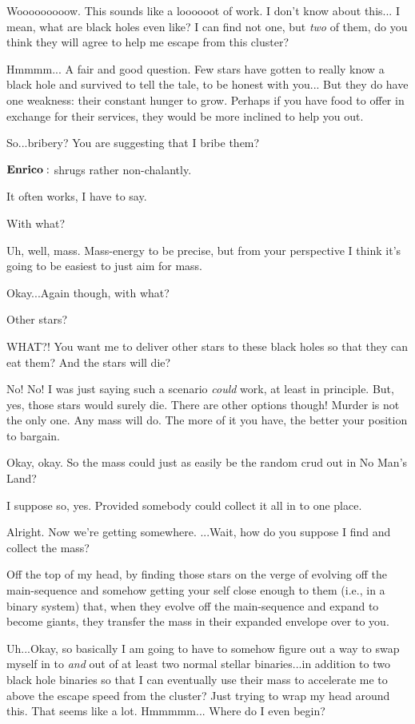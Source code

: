 \Sterope Wooooooooow.  This sounds like a loooooot of work.  I don't know about this... I mean, what are black holes even like?   I can find not one, but \textit{two} of them, do you think they will agree to help me escape from this cluster?

\Enrico Hmmmm... A fair and good question.  Few stars have gotten to really know a black hole and survived to tell the tale, to be honest with you... But they do have one weakness:  their constant hunger to grow.  Perhaps if you have food to offer in exchange for their services, they would be more inclined to help you out.  

\Sterope  So...bribery?  You are suggesting that I bribe them?  

$\Enrico$ shrugs rather non-chalantly.

\Enrico It often works, I have to say.

\Sterope With what?

\Enrico Uh, well, mass.  Mass-energy to be precise, but from your perspective I think it's going to be easiest to just aim for mass.

\Sterope Okay...Again though, with what?

\Enrico Other stars?

\Sterope WHAT?! You want me to deliver other stars to these black holes so that they can eat them?  And the stars will die?

\Enrico No! No! I was just saying such a scenario \textit{could} work, at least in principle.  But, yes, those stars would surely die.  There are other options though!  Murder is not the only one.  Any mass will do.  The more of it you have, the better your position to bargain.

\Sterope Okay, okay. So the mass could just as easily be the random crud out in No Man's Land?

\Enrico I suppose so, yes.  Provided somebody could collect it all in to one place.

\Sterope Alright.  Now we're getting somewhere.  ...Wait, how do you suppose I find and collect the mass?

\Enrico Off the top of my head, by finding those stars on the verge of evolving off the main-sequence and somehow getting your self close enough to them (i.e., in a binary system) that, when they evolve off the main-sequence and expand to become giants, they transfer the mass in their expanded envelope over to you.

\Sterope  Uh...Okay, so basically I am going to have to somehow figure out a way to swap myself in to \textit{and} out of at least two normal stellar binaries...in addition to two black hole binaries so that I can eventually use their mass to accelerate me to above the escape speed from the cluster?  Just trying to wrap my head around this.  That seems like a lot.  Hmmmmm... Where do I even begin?

